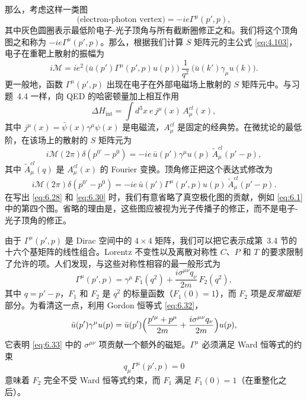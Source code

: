 那么，考虑这样一类图
\begin{equation}
  \text{(electron-photon vertex)} = -ie\Gamma^\mu(p', p),
\end{equation}
其中灰色圆圈表示最低阶电子-光子顶角与所有截断圈修正之和。我们将这个顶角图之和称为 $-ie\Gamma^\mu(p',p)$。那么，根据我们计算 $S$ 矩阵元的主公式 \eqref{eq:4.103}，电子在重靶上散射的振幅为
\begin{equation}
  i\mathcal{M} = ie^2\ \bigl( \bar{u}(p')\Gamma^\mu(p',p)u(p) \bigr)\
    \frac{1}{q^2}\ \bigl( \bar{u}(k')\gamma_\mu u(k) \bigr).
  \label{eq:6.28}
\end{equation}
更一般地，函数 $\Gamma^\mu(p',p)$ 出现在电子在外部电磁场上散射的 $S$ 矩阵元中。与习题~4.4 一样，向 QED 的哈密顿量加上相互作用
\begin{equation}
  \Delta H_{\mathrm{int}} = \int d^3x\ e\,j^\mu(x)\,A^{cl}_\mu(x),
  \label{eq:6.29}
\end{equation}
其中 $j^\mu(x) = \bar{\psi}(x)\gamma^\mu\psi(x)$ 是电磁流，$A^{cl}_\mu$ 是固定的经典势。在微扰论的最低阶，在该场上的散射的 $S$ 矩阵元为
\begin{equation}
  i\mathcal{M}(2\pi)\delta(p^{0'}-p^0) = -ie\,\bar{u}(p')\gamma^\mu u(p)\,
    \tilde{A}^{cl}_\mu(p'-p),
\end{equation}
其中 $\tilde{A}^{cl}_\mu(q)$ 是 $A^{cl}_\mu(x)$ 的 Fourier 变换。顶角修正把这个表达式修改为
\begin{equation}
  i\mathcal{M}(2\pi)\delta(p^{0'}-p^0) = -ie\,\bar{u}(p')\Gamma^\mu(p',p)u(p)\,
    \tilde{A}^{cl}_\mu(p'-p) .
  \label{eq:6.30}
\end{equation}
在写出 \eqref{eq:6.28} 和 \eqref{eq:6.30} 时，我们有意省略了真空极化图的贡献，例如 \eqref{eq:6.1} 中的第四个图。省略的理由是，这些图应被视为光子传播子的修正，而不是电子-光子顶角的修正。

由于 $\Gamma^\mu(p',p)$ 是 Dirac 空间中的 $4\times4$ 矩阵，我们可以把它表示成第~3.4 节的十六个基矩阵的线性组合。Lorentz 不变性以及离散对称性 $C$、$P$ 和 $T$ 的要求限制了允许的项。人们发现，与这些对称性相容的最一般形式为
\begin{equation}
  \Gamma^\mu(p',p) = \gamma^\mu\,F_1(q^2)
    + \frac{i\sigma^{\mu\nu}q_\nu}{2m}\,F_2(q^2),
  \label{eq:6.33}
\end{equation}
其中 $q = p'-p$，$F_1$ 和 $F_2$ 是 $q^2$ 的标量函数（$F_1(0) = 1$），而 $F_2$ 项是\emph{反常磁矩}部分。为看清这一点，利用 Gordon 恒等式 \eqref{eq:6.32}，
\begin{equation}
  \bar{u}(p')\gamma^\mu u(p) = \bar{u}(p')\Bigl(
    \frac{p'^{\mu}+p^{\mu}}{2m} + \frac{i\sigma^{\mu\nu}q_\nu}{2m} \Bigr)u(p),
  \label{eq:6.32}
\end{equation}
它表明 \eqref{eq:6.33} 中的 $\sigma^{\mu\nu}$ 项贡献一个额外的磁矩。$\Gamma^\mu$ 必须满足 Ward 恒等式的约束
\begin{equation}
  q_\mu\Gamma^\mu(p',p) = 0
\end{equation}
意味着 $F_2$ 完全不受 Ward 恒等式约束，而 $F_1$ 满足 $F_1(0) = 1$（在重整化之后）。

